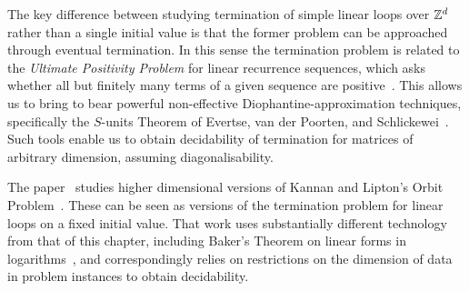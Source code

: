 The key difference between studying termination of simple linear loops
over $\mathbb{Z}^{d}$ rather than a single initial value is that the
former problem can be approached through eventual termination.  In
this sense the termination problem is related to the \emph{Ultimate
  Positivity Problem} for linear recurrence sequences, which asks
whether all but finitely many terms of a given sequence are
positive~\cite{OuaknineW13b}.  This allows us to bring to bear powerful
non-effective Diophantine-approximation techniques,
specifically the $S$-units Theorem of Evertse, van der Poorten, and
Schlickewei~\cite{Evertse84,PS82}.  Such tools enable us to obtain
decidability of termination for matrices of arbitrary dimension,
assuming diagonalisability.

The paper~\cite{COW13} studies higher dimensional versions of
Kannan and Lipton's Orbit Problem~\cite{KL86}.  These can be seen as
versions of the termination problem for linear loops on a fixed
initial value.  That work uses substantially different technology from
that of this chapter, including Baker's Theorem on linear forms
in logarithms~\cite{BW93}, and correspondingly relies on restrictions
on the dimension of data in problem instances to obtain decidability.

